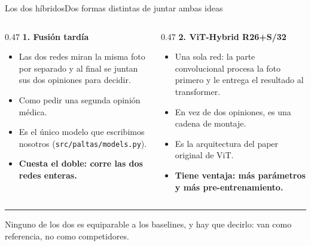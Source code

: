 \documentclass[aspectratio=169,11pt,table]{beamer}
\newcommand{\cierre}[1]{%
  \vfill
  {\color{verdecla}\rule{2.5pt}{0.9em}}\hspace{0.4em}%
  {\footnotesize\color{grisSuave}#1}%
}
\begin{document}
\begin{frame}{Los dos híbridos}{Dos formas distintas de juntar ambas ideas}
\begin{columns}[T]
\begin{column}{0.47\textwidth}
{\small\textbf{\color{morado}1. Fusión tardía}}
{\scriptsize
\setlength{\itemsep}{0.15em}
\begin{itemize}
  \item Las dos redes miran la misma foto por separado y al final se juntan sus dos opiniones para decidir.
  \item Como pedir una segunda opinión médica.
  \item Es el único modelo que escribimos nosotros (\texttt{src/paltas/models.py}).
  \item {\bfseries Cuesta el doble: corre las dos redes enteras.}
\end{itemize}
}
\end{column}
\begin{column}{0.47\textwidth}
{\small\textbf{\color{morado}2. ViT-Hybrid R26+S/32}}
{\scriptsize
\setlength{\itemsep}{0.15em}
\begin{itemize}
  \item Una sola red: la parte convolucional procesa la foto primero y le entrega el resultado al transformer.
  \item En vez de dos opiniones, es una cadena de montaje.
  \item Es la arquitectura del paper original de ViT.
  \item {\bfseries Tiene ventaja: más parámetros y más pre-entrenamiento.}
\end{itemize}
}
\end{column}
\end{columns}
\cierre{Ninguno de los dos es equiparable a los baselines, y hay que decirlo: van como referencia, no como competidores.}
\end{frame}
\end{document}
